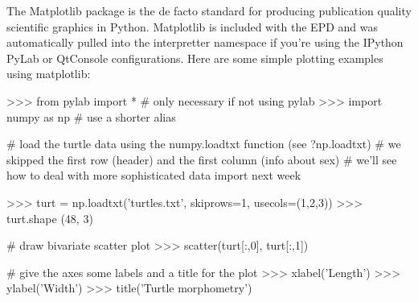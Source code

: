 The Matplotlib package is the de facto standard for producing
publication quality scientific graphics in Python. Matplotlib is
included with the EPD and was automatically pulled into the interpretter
namespace if you're using the IPython PyLab or QtConsole configurations. Here are some simple plotting examples using matplotlib:
%
\begin{python}
>>> from pylab import * # only necessary if not using pylab
>>> import numpy as np # use a shorter alias

# load the turtle data using the numpy.loadtxt function (see ?np.loadtxt)
# we skipped the first row (header) and the first column (info about sex)
# we'll see how to deal with more sophisticated data import next week

>>> turt = np.loadtxt('turtles.txt', skiprows=1, usecols=(1,2,3))
>>> turt.shape
(48, 3)

# draw bivariate scatter plot
>>> scatter(turt[:,0], turt[:,1])

# give the axes some labels and a title for the plot
>>> xlabel('Length')
>>> ylabel('Width')
>>> title('Turtle morphometry')
\end{python}